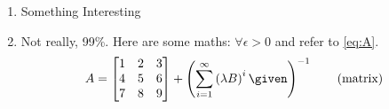 \documentclass[a4paper]{article}
\begin{document}
\begin{enumerate}[label = (\alph*)]
	\item
		Something Interesting %
	\item
		Not really, 99\%.
		Here are some maths:
		$\forall\epsilon>0$ and refer to \eqref{eq:A}.
		\begin{align}\label{eq:A}
			A =
			\begin{bmatrix}
				1 & 2 & 3 \\
				4 & 5 & 6 \\
				7 & 8 & 9 \\
			\end{bmatrix}
			+
			\left(\sum_{i=1}^{\infty}\left(\lambda B\right)^{i}\given\right)^{-1}
			\tag{matrix}
		\end{align}
\end{enumerate}
\end{document}
